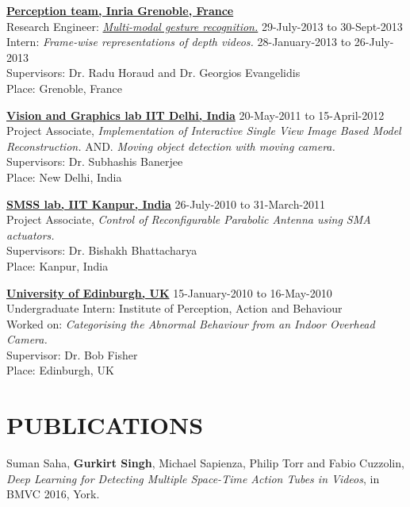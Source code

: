 \documentclass[line, margin]{res}
\begin{document}
\begin{resume}
\href{https://team.inria.fr/perception/}{\textbf{Perception team, Inria Grenoble, France}}  \\
Research Engineer: \href{http://gesture.chalearn.org/2013-multi-modal-challenge}{\emph{Multi-modal gesture recognition.}} \hfill 29-July-2013 to 30-Sept-2013 \\
Intern: \emph{Frame-wise representations of depth videos.} \hfill 28-January-2013 to 26-July-2013 \\
Supervisors: Dr. Radu Horaud and Dr. Georgios Evangelidis\\
Place: Grenoble, France

\textbf{\href{http://www.iitd.ac.in/}{Vision and Graphics lab IIT Delhi, India}} \hfill 20-May-2011 to 15-April-2012 \\
Project Associate, \emph{Implementation of Interactive Single View Image Based Model Reconstruction.} AND. 
\emph{Moving object detection with moving camera.} \\
Supervisors: Dr. Subhashis Banerjee\\
Place: New Delhi, India

\textbf{\href{http://www.iitk.ac.in/}{SMSS lab, IIT Kanpur, India}} \hfill 26-July-2010 to 31-March-2011 \\
Project Associate, \emph{Control of Reconfigurable Parabolic Antenna using SMA actuators.}\\
Supervisors: Dr. Bishakh Bhattacharya\\
Place: Kanpur, India

\textbf{\href{http://www.ed.ac.uk/home}{University of Edinburgh, UK} }\hfill 15-January-2010 to 16-May-2010 \\
Undergraduate  Intern: {Institute of Perception, Action and Behaviour} \\ 
Worked on: \emph{Categorising the Abnormal Behaviour from an Indoor Overhead Camera.} \\
Supervisor: Dr. Bob Fisher\\
Place: Edinburgh, UK


\section{PUBLICATIONS}
Suman Saha, \textbf{Gurkirt Singh}, Michael Sapienza, Philip Torr and Fabio Cuzzolin, 
\emph{Deep Learning for Detecting Multiple Space-Time Action Tubes in Videos}, 
in BMVC 2016, York.


\end{resume}
\end{document}
